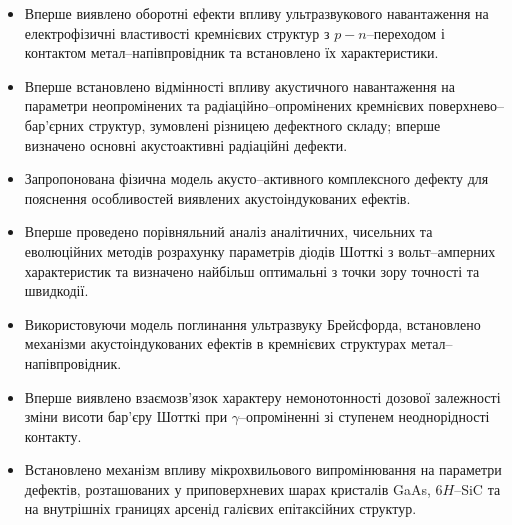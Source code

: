 \begin{itemize}[leftmargin=0em,itemindent=1.5em]
\renewcommand{\labelitemi}{$\bullet$}
  \item Вперше виявлено оборотні ефекти впливу ультразвукового навантаження на електрофізичні
   властивості кремнієвих структур з $p-n$--переходом і контактом метал--напівпровідник
   та встановлено їх характеристики.

  \item Вперше встановлено відмінності впливу акустичного навантаження на параметри неопромінених та радіаційно--опромінених кремнієвих поверхнево--бар'єрних структур,
  зумовлені різницею дефектного складу;
      вперше визначено основні акустоактивні радіаційні дефекти.

  \item Запропонована фізична модель акусто--активного комплексного дефекту для пояснення особливостей виявлених акустоіндукованих ефектів.

  \item Вперше проведено порівняльний аналіз аналітичних, чисельних та еволюційних методів розрахунку параметрів діодів Шотткі з вольт--амперних характеристик та визначено найбільш оптимальні з точки зору точності та швидкодії.

  \item Використовуючи модель поглинання ультразвуку Брейсфорда, встановлено механізми акустоіндукованих ефектів в кремнієвих структурах метал--напівпровідник.


  \item Вперше виявлено  взаємозв'язок характеру немонотонності дозової залежності зміни висоти бар'єру Шотткі при $\gamma$--опроміненні зі ступенем неоднорідності контакту.

  \item Встановлено механізм впливу мікрохвильового випромінювання на параметри дефектів, розташованих у приповерхневих шарах кристалів GaAs, 6$H$--SiC та на внутрішніх границях арсенід галієвих епітаксійних структур.


\end{itemize}



